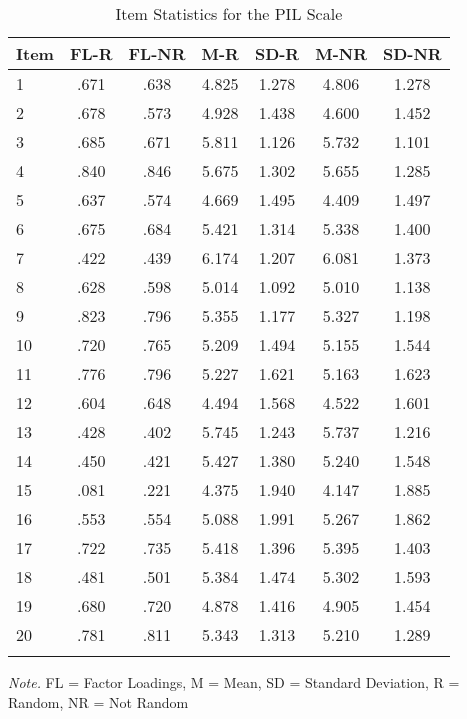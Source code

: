 \documentclass[english,man, mask]{apa6}
\theoremstyle{definition}
\theoremstyle{definition}
\theoremstyle{definition}
\theoremstyle{remark}
\begin{document}
\begin{table}[tbp]
\begin{center}
\begin{threeparttable}
\caption{\label{tab:Ptable}Item Statistics for the PIL Scale}
\begin{tabular}{lcccccc}
\toprule
Item & \multicolumn{1}{c}{FL-R} & \multicolumn{1}{c}{FL-NR} & \multicolumn{1}{c}{M-R} & \multicolumn{1}{c}{SD-R} & \multicolumn{1}{c}{M-NR} & \multicolumn{1}{c}{SD-NR}\\
\midrule
1 & .671 & .638 & 4.825 & 1.278 & 4.806 & 1.278\\
2 & .678 & .573 & 4.928 & 1.438 & 4.600 & 1.452\\
3 & .685 & .671 & 5.811 & 1.126 & 5.732 & 1.101\\
4 & .840 & .846 & 5.675 & 1.302 & 5.655 & 1.285\\
5 & .637 & .574 & 4.669 & 1.495 & 4.409 & 1.497\\
6 & .675 & .684 & 5.421 & 1.314 & 5.338 & 1.400\\
7 & .422 & .439 & 6.174 & 1.207 & 6.081 & 1.373\\
8 & .628 & .598 & 5.014 & 1.092 & 5.010 & 1.138\\
9 & .823 & .796 & 5.355 & 1.177 & 5.327 & 1.198\\
10 & .720 & .765 & 5.209 & 1.494 & 5.155 & 1.544\\
11 & .776 & .796 & 5.227 & 1.621 & 5.163 & 1.623\\
12 & .604 & .648 & 4.494 & 1.568 & 4.522 & 1.601\\
13 & .428 & .402 & 5.745 & 1.243 & 5.737 & 1.216\\
14 & .450 & .421 & 5.427 & 1.380 & 5.240 & 1.548\\
15 & .081 & .221 & 4.375 & 1.940 & 4.147 & 1.885\\
16 & .553 & .554 & 5.088 & 1.991 & 5.267 & 1.862\\
17 & .722 & .735 & 5.418 & 1.396 & 5.395 & 1.403\\
18 & .481 & .501 & 5.384 & 1.474 & 5.302 & 1.593\\
19 & .680 & .720 & 4.878 & 1.416 & 4.905 & 1.454\\
20 & .781 & .811 & 5.343 & 1.313 & 5.210 & 1.289\\
\bottomrule
\addlinespace
\end{tabular}
\begin{tablenotes}[para]
\textit{Note.} FL = Factor Loadings, M = Mean, SD = Standard Deviation, R = Random, NR = Not Random
\end{tablenotes}
\end{threeparttable}
\end{center}
\end{table}
\end{document}

